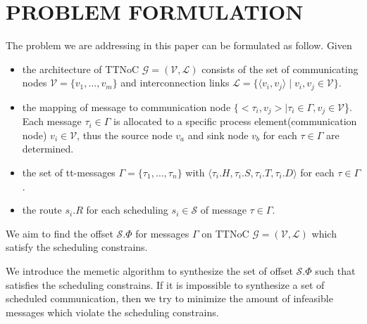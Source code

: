 \documentclass[journal]{IEEEtran}
\newcommand{\calG}{\mathcal{G}}
\newcommand{\calV}{\mathcal{V}}
\newcommand{\calL}{\mathcal{L}}
\newcommand{\calS}{\mathcal{S}}
\begin{document}
\section{PROBLEM FORMULATION\label{s:formulation}}
The problem we are addressing in this paper can be formulated as follow. Given 
\begin{itemize}
	\item the architecture of TTNoC $\calG=(\calV,\calL)$ consists of the set of communicating nodes $\mathcal{V}=\{\mathit{v}_{1},\dots,\mathit{v}_{m}\}$ and interconnection links $\mathcal{L}=\{ \langle v_i,v_j  \rangle \mid  v_i,v_j \in \calV\}$.
	\item the mapping of message to communication node
		$\{<\tau_{i},v_{j}>\mid \tau_{i}\in\Gamma,v_{j}\in\mathcal{V}$\}. 
		Each message $\tau_{i}\in\Gamma$ is allocated to a specific process element(communication node) $v_{i}\in\mathcal{V}$, 
		thus the source node $v_{a}$ and sink node $v_{b}$ for each $\tau \in\Gamma$ are determined.
	\item the set of tt-messages $ \Gamma = \{\tau_{1},\dots,\tau_{n} \}$ with 
	$\langle \tau_{i}.H,\tau_{i}.S, \tau_{i}.T,	\tau_{i}.D\rangle$ for each $\tau \in \Gamma$.
	\item the route $s_i.R$ for each scheduling $s_i \in \calS$ of message $\tau \in \Gamma$.
\end{itemize}
We aim to find the offset $\calS.\Phi$ for messages $\Gamma$ on TTNoC $\calG=(\calV,\calL)$ which satisfy the scheduling constrains. 

We introduce the memetic algorithm to synthesize the set of offset $\calS.\Phi$ such that satisfies the scheduling constrains. 
If it is impossible to synthesize a set of scheduled communication, 
then we try to minimize the amount of infeasible messages which violate the scheduling constrains.
\end{document}
